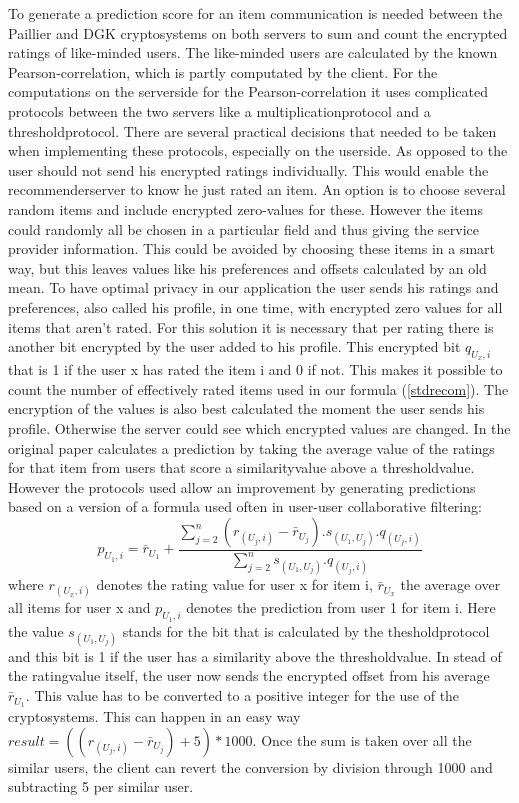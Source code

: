 \documentclass[twocolumn]{phdsymp} %
\begin{document}
 To generate a prediction score for an item communication is needed between the Paillier and DGK cryptosystems on both servers to sum and count the encrypted ratings of like-minded users. The like-minded users are calculated by the known Pearson-correlation, which is partly computated by the client. For the computations on the serverside for the Pearson-correlation it uses complicated protocols between the two servers like a multiplicationprotocol and a thresholdprotocol. There are several practical decisions that needed to be taken when implementing these protocols, especially on the userside. As opposed to \cite{dyn} the user should not send his encrypted ratings individually. This would enable the recommenderserver to know he just rated an item. An option is to choose several random items and include encrypted zero-values for these. However the items could randomly all be chosen in a particular field and thus giving the service provider information. This could be avoided by choosing these items in a smart way, but this leaves values like his preferences and offsets calculated by an old mean. To have optimal privacy in our application the user sends his ratings and preferences, also called his profile, in one time, with encrypted zero values for all items that aren't rated. For this solution it is necessary that per rating there is another bit encrypted by the user added to his profile. This encrypted bit $ q_{U_x,i} $ that is 1 if the user x has rated the item i and 0 if not. This makes it possible to count the number of effectively rated items used in our formula (\ref{stdrecom}). The encryption of the values is also best calculated the moment the user sends his profile. Otherwise the server could see which encrypted values are changed. In the original paper \cite{dyn} calculates a prediction by taking the average value of the ratings for that item from users that score a similarityvalue above a thresholdvalue. However the protocols used allow an improvement by generating predictions based on a version of a formula used often in user-user collaborative filtering:
\begin{equation}\label{stdrecom}p_{U_1,i} = \bar{r}_{U_1} + \frac{\sum_{j=2}^{n}(r_{(U_j,i)} - \bar{r}_{U_j}).s_{(U_1,U_j)}.q_{(U_j,i)}}{\sum_{j=2}^{n} s_{(U_1,U_j)}.q_{(U_j,i)} }
\end{equation}
where $r_{(U_x,i)}$ denotes the rating value for user x for item i, $\bar{r}_{U_x}$ the average over all items for user x and $p_{U_1,i}$ denotes the prediction from user 1 for item i.
Here the value $s_{(U_1,U_j)}$ stands for the bit that is calculated by the thesholdprotocol and this bit is 1 if the user has a similarity above the thresholdvalue. In stead of the ratingvalue itself, the user now sends the encrypted offset from his average $\bar{r}_{U_1}$. This value has to be converted to a positive integer for the use of the cryptosystems. This can happen in an easy way $result = ((r_{(U_j,i)} - \bar{r}_{U_j})+5)*1000$. Once the sum is taken over all the similar users, the client can revert the conversion by division through 1000 and subtracting 5 per similar user.
\end{document}
